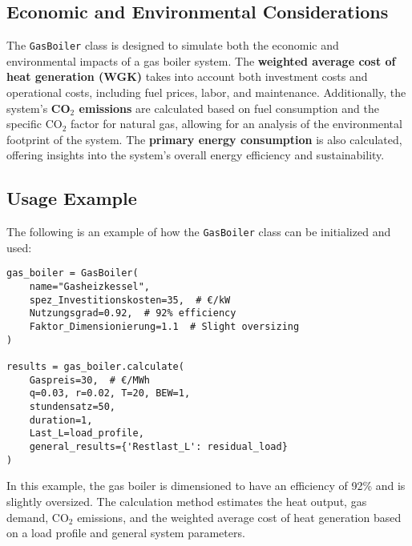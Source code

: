 \subsection{Economic and Environmental Considerations}
The \texttt{GasBoiler} class is designed to simulate both the economic and environmental impacts of a gas boiler system. The \textbf{weighted average cost of heat generation (WGK)} takes into account both investment costs and operational costs, including fuel prices, labor, and maintenance. Additionally, the system's \textbf{CO$_2$ emissions} are calculated based on fuel consumption and the specific CO$_2$ factor for natural gas, allowing for an analysis of the environmental footprint of the system. The \textbf{primary energy consumption} is also calculated, offering insights into the system's overall energy efficiency and sustainability.

\subsection{Usage Example}
The following is an example of how the \texttt{GasBoiler} class can be initialized and used:

\begin{verbatim}
gas_boiler = GasBoiler(
    name="Gasheizkessel",
    spez_Investitionskosten=35,  # €/kW
    Nutzungsgrad=0.92,  # 92% efficiency
    Faktor_Dimensionierung=1.1  # Slight oversizing
)

results = gas_boiler.calculate(
    Gaspreis=30,  # €/MWh
    q=0.03, r=0.02, T=20, BEW=1, 
    stundensatz=50, 
    duration=1, 
    Last_L=load_profile, 
    general_results={'Restlast_L': residual_load}
)
\end{verbatim}

In this example, the gas boiler is dimensioned to have an efficiency of 92\% and is slightly oversized. The calculation method estimates the heat output, gas demand, CO$_2$ emissions, and the weighted average cost of heat generation based on a load profile and general system parameters.